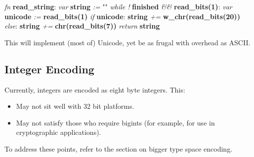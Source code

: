 \begin{changemargin}{-60mm}{0mm}
\begin{myquote}

\vbox{
\textit{fn} \textbf{read\_string}: \newline
\indent\hspace{.5cm} \textit{var} \textbf{string} \textit{:=} "" \newline
\indent\hspace{.5cm} \textit{while !} \textbf{finished} \textit{\&\&} \textbf{read\_bits(1)}: \newline
\indent\hspace{1cm} \textit{var} \textbf{unicode} \textit{:=} \textbf{read\_bits(1)} \newline
\indent\hspace{1cm} \textit{if} \textbf{unicode}: \newline
\indent\hspace{1.5cm} \textbf{string} \textit{+=} \textbf{w\_chr(read\_bits(20))} \newline
\indent\hspace{1cm} \textit{else}: \newline
\indent\hspace{1.5cm} \textbf{string} \textit{+=} \textbf{chr(read\_bits(7))} \newline
\indent\hspace{.5cm} \textit{return} \textbf{string} \newline
}

\end{myquote}
\end{changemargin}

This will implement (most of) Unicode, yet be as frugal with
overhead as ASCII.

\subsection{Integer Encoding}

Currently, integers are encoded as eight byte integers. This:

\begin{itemize}
\item May not sit well with 32 bit platforms.
\item May not satisfy those who require bigints (for example, for use in
      cryptographic applications).
\end{itemize}

To address these points, refer to the section on bigger type space
encoding.

